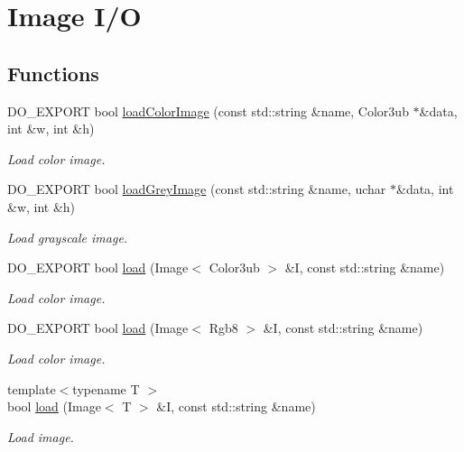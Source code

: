 \hypertarget{group___image_i_o}{\section{Image I/\-O}
\label{group___image_i_o}
}
\subsection*{Functions}
\begin{DoxyCompactItemize}
\item 
D\-O\-\_\-\-E\-X\-P\-O\-R\-T bool \hyperlink{group___image_i_o_gace802b1b4fbf2c8cb73bef0481c03a74}{load\-Color\-Image} (const std\-::string \&name, Color3ub $\ast$\&data, int \&w, int \&h)
\begin{DoxyCompactList}\small\item\em Load color image. \end{DoxyCompactList}\item 
D\-O\-\_\-\-E\-X\-P\-O\-R\-T bool \hyperlink{group___image_i_o_gaeb2394c812f813fd77f1106709b5484d}{load\-Grey\-Image} (const std\-::string \&name, uchar $\ast$\&data, int \&w, int \&h)
\begin{DoxyCompactList}\small\item\em Load grayscale image. \end{DoxyCompactList}\item 
D\-O\-\_\-\-E\-X\-P\-O\-R\-T bool \hyperlink{group___image_i_o_ga3f159548cda10d37b3ffcb6edc45d6be}{load} (Image$<$ Color3ub $>$ \&I, const std\-::string \&name)
\begin{DoxyCompactList}\small\item\em Load color image. \end{DoxyCompactList}\item 
D\-O\-\_\-\-E\-X\-P\-O\-R\-T bool \hyperlink{group___image_i_o_ga863c35bb044665359b8c170480f1e98e}{load} (Image$<$ Rgb8 $>$ \&I, const std\-::string \&name)
\begin{DoxyCompactList}\small\item\em Load color image. \end{DoxyCompactList}\item 
{\footnotesize template$<$typename T $>$ }\\bool \hyperlink{group___image_i_o_ga55434e11aa6293606de098414d7b5ae4}{load} (Image$<$ T $>$ \&I, const std\-::string \&name)
\begin{DoxyCompactList}\small\item\em Load image. \end{DoxyCompactList}\item 

\end{DoxyCompactItemize}
